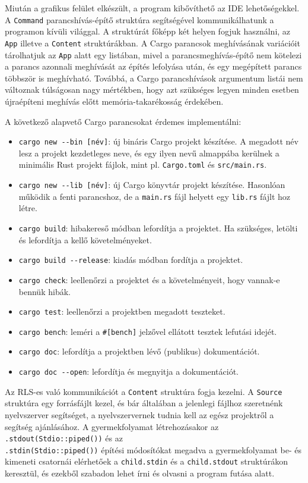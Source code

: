 Miután a grafikus felület elkészült, a program kibővíthető az IDE lehetőségekkel.
A \texttt{Command} parancshívás-építő struktúra segítségével kommunikálhatunk a programon kívüli világgal.
A struktúrát főképp két helyen fogjuk használni, az \texttt{App} illetve a \texttt{Content} struktúrákban.
A Cargo parancsok meghívásának variációit tárolhatjuk az \texttt{App} alatt egy listában,
mivel a parancsmeghívás-építő nem kötelezi a parancs azonnali meghívását az építés lefolyása után,
és egy megépített parancs többször is meghívható.
Továbbá, a Cargo parancshívások argumentum listái nem változnak túlságosan nagy mértékben,
hogy azt szükséges legyen minden esetben újraépíteni meghívás előtt memória-takarékosság érdekében.

A következő alapvető Cargo parancsokat érdemes implementálni:

\begin{itemize}
    \item \verb+cargo new --bin [név]+: új bináris Cargo projekt készítése. 
    A megadott név lesz a projekt kezdetleges neve, és egy ilyen nevű almappába kerülnek a minimális Rust projekt fájlok,
    mint pl. \texttt{Cargo.toml} és \texttt{src/main.rs}.
    \item \verb+cargo new --lib [név]+: új Cargo könyvtár projekt készítése.
    Hasonlóan működik a fenti parancshoz, de a \texttt{main.rs} fájl helyett egy \texttt{lib.rs} fájlt hoz létre.
    \item \verb+cargo build+: hibakereső módban lefordítja a projektet.
    Ha szükséges, letölti és lefordítja a kellő követelményeket.
    \item \verb+cargo build --release+: kiadás módban fordítja a projektet.
    \item \verb+cargo check+: leellenőrzi a projektet és a követelményeit, hogy vannak-e bennük hibák.
    \item \verb+cargo test+: leellenőrzi a projektben megadott teszteket.
    \item \verb+cargo bench+: leméri a \verb+#[bench]+ jelzővel ellátott tesztek lefutási idejét.
    \item \verb+cargo doc+: lefordítja a projektben lévő (publikus) dokumentációt.
    \item \verb+cargo doc --open+: lefordítja és megnyitja a dokumentációt.
\end{itemize}

Az RLS-es való kommunikációt a \texttt{Content} struktúra fogja kezelni.
A \texttt{Source} struktúra egy forrásfájlt kezel, és bár általában a jelenlegi fájlhoz szeretnénk
nyelvszerver segítséget, a nyelvszervernek tudnia kell az egész projektről a segítség ajánlásához.
A gyermekfolyamat létrehozásakor az \texttt{.stdout(Stdio::piped())} és az\\ \texttt{.stdin(Stdio::piped())}
építési módosítókat megadva a gyermekfolyamat be- és kimeneti csatornái elérhetőek a \texttt{child.stdin}
és a \texttt{child.stdout} struktúrákon keresztül, és ezekből szabadon lehet írni és olvasni a program futása alatt.

